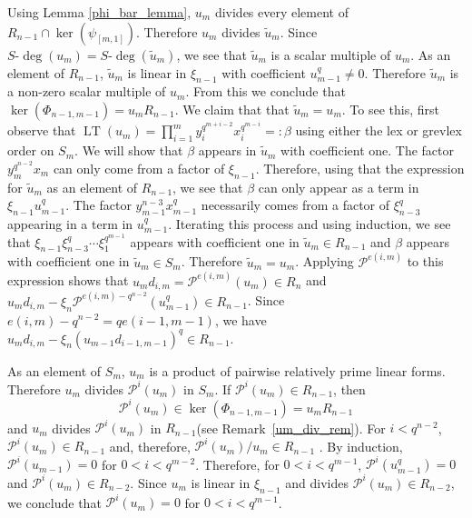 \documentclass{amsart}
\newcommand{\PP}{\mathcal{P}}
\DeclareMathOperator{\lt}{LT}
\newcommand{\wdeg}{{S\mbox{-}\deg}}
\begin{document}
Using Lemma \ref{phi_bar_lemma}, $u_m$ divides every element 
of $R_{n-1}\cap\ker(\psi_{[m,1]})$. Therefore $u_m$ divides $\widetilde{u}_m$.
Since $\wdeg(u_m)=\wdeg(\widetilde{u}_m)$, we see that  $\widetilde{u}_m$
is a scalar multiple of $u_m$.
As an element of $R_{n-1}$, $\widetilde{u}_m$ is linear in $\xi_{n-1}$
with coefficient $u_{m-1}^q\not=0$. Therefore $\widetilde{u}_m$
is a non-zero scalar multiple of $u_m$.
From this we conclude that $\ker(\Phi_{n-1,m-1})=u_mR_{n-1}$.
We claim that that $\widetilde{u}_m=u_m$. To see this, first observe that
$\lt(u_m)=\prod_{i=1}^m y_i^{q^{m+i-2}} x_i^{q^{m-i}}= : \beta$ using either the lex or grevlex order on $S_m$. We will show that $\beta$ appears in $\widetilde{u}_m$ with coefficient one. The factor $y_m^{q^{n-2}}x_m$
can only come from a factor of $\xi_{n-1}$. Therefore, using that the expression for $\widetilde{u}_m$ as an element of $R_{n-1}$, we see that $\beta$ can only appear as a term in $\xi_{n-1}u_{m-1}^q$. The factor $y_{m-1}^{n-3}x_{m-1}^q$ necessarily comes 
from a factor of $\xi_{n-3}^q$ appearing in a term in $u_{m-1}^q$.
Iterating this process and using induction, we see that
$\xi_{n-1}\xi_{n-3}^q\cdots\xi_{1}^{q^{m-1}}$ appears with coefficient one in $\widetilde{u}_m\in R_{n-1}$ and $\beta$ appears with coefficient one in $\widetilde{u}_m\in S_m$. Therefore $\widetilde{u}_m=u_m$.
Applying $\PP^{e(i,m)}$ to this expression shows that
$u_md_{i,m}=\PP^{e(i,m)}(u_m)\in R_{n}$ and $u_md_{i,m}-\xi_{n}\PP^{e(i,m)-q^{n-2}}(u_{m-1}^q)\in R_{n-1}$.
Since $e(i,m)-q^{n-2}=qe(i-1,m-1)$, we have $u_md_{i,m}-\xi_{n}(u_{m-1}d_{i-1,m-1})^q\in R_{n-1}$.

As an element of $S_m$, $u_m$ is a product of pairwise relatively prime linear forms. Therefore $u_m$ divides $\PP^i(u_m)$ in $S_m$.
If $\PP^i(u_m)\in R_{n-1}$, then 
$$\PP^i(u_m)\in  \ker(\Phi_{n-1,m-1})=u_mR_{n-1}$$ and $u_m$ divides 
$\PP^i(u_m)$ in $R_{n-1}$(see Remark~\ref{um_div_rem}).
For $i<q^{n-2}$, $\PP^i(u_m)\in R_{n-1}$ and, therefore, $\PP^i(u_m)/u_m\in R_{n-1}$ .
By induction, $\PP^i(u_{m-1})=0$ for $0<i<q^{m-2}$. Therefore, for $0<i<q^{m-1}$, $\PP^i(u_{m-1}^q)=0$ and $\PP^i(u_m)\in R_{n-2}$.
Since $u_m$ is linear in $\xi_{n-1}$ and divides $\PP^i(u_m)\in R_{n-2}$, we conclude that $\PP^i(u_m)=0$ for $0<i<q^{m-1}$.
\end{document}
